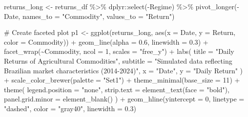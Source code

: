 \documentclass[
  10pt,
  a4paper,
]{article}
\newenvironment{Shaded}{\begin{snugshade}}{\end{snugshade}}
\newcommand{\AttributeTok}[1]{\textcolor[rgb]{0.40,0.45,0.13}{#1}}
\newcommand{\CommentTok}[1]{\textcolor[rgb]{0.37,0.37,0.37}{#1}}
\newcommand{\DecValTok}[1]{\textcolor[rgb]{0.68,0.00,0.00}{#1}}
\newcommand{\FloatTok}[1]{\textcolor[rgb]{0.68,0.00,0.00}{#1}}
\newcommand{\FunctionTok}[1]{\textcolor[rgb]{0.28,0.35,0.67}{#1}}
\newcommand{\NormalTok}[1]{\textcolor[rgb]{0.00,0.23,0.31}{#1}}
\newcommand{\OtherTok}[1]{\textcolor[rgb]{0.00,0.23,0.31}{#1}}
\newcommand{\SpecialCharTok}[1]{\textcolor[rgb]{0.37,0.37,0.37}{#1}}
\newcommand{\StringTok}[1]{\textcolor[rgb]{0.13,0.47,0.30}{#1}}
\begin{document}
\begin{Shaded}
\begin{Highlighting}[]
\NormalTok{returns\_long }\OtherTok{\textless{}{-}}\NormalTok{ returns\_df }\SpecialCharTok{\%\textgreater{}\%}
\NormalTok{  dplyr}\SpecialCharTok{::}\FunctionTok{select}\NormalTok{(}\SpecialCharTok{{-}}\NormalTok{Regime) }\SpecialCharTok{\%\textgreater{}\%}
  \FunctionTok{pivot\_longer}\NormalTok{(}\SpecialCharTok{{-}}\NormalTok{Date, }\AttributeTok{names\_to =} \StringTok{"Commodity"}\NormalTok{, }\AttributeTok{values\_to =} \StringTok{"Return"}\NormalTok{)}

\CommentTok{\# Create faceted plot}
\NormalTok{p1 }\OtherTok{\textless{}{-}} \FunctionTok{ggplot}\NormalTok{(returns\_long, }\FunctionTok{aes}\NormalTok{(}\AttributeTok{x =}\NormalTok{ Date, }\AttributeTok{y =}\NormalTok{ Return, }\AttributeTok{color =}\NormalTok{ Commodity)) }\SpecialCharTok{+}
  \FunctionTok{geom\_line}\NormalTok{(}\AttributeTok{alpha =} \FloatTok{0.6}\NormalTok{, }\AttributeTok{linewidth =} \FloatTok{0.3}\NormalTok{) }\SpecialCharTok{+}
  \FunctionTok{facet\_wrap}\NormalTok{(}\SpecialCharTok{\textasciitilde{}}\NormalTok{Commodity, }\AttributeTok{ncol =} \DecValTok{1}\NormalTok{, }\AttributeTok{scales =} \StringTok{"free\_y"}\NormalTok{) }\SpecialCharTok{+}
  \FunctionTok{labs}\NormalTok{(}
    \AttributeTok{title =} \StringTok{"Daily Returns of Agricultural Commodities"}\NormalTok{,}
    \AttributeTok{subtitle =} \StringTok{"Simulated data reflecting Brazilian market characteristics (2014{-}2024)"}\NormalTok{,}
    \AttributeTok{x =} \StringTok{"Date"}\NormalTok{,}
    \AttributeTok{y =} \StringTok{"Daily Return"}
\NormalTok{  ) }\SpecialCharTok{+}
  \FunctionTok{scale\_color\_brewer}\NormalTok{(}\AttributeTok{palette =} \StringTok{"Set1"}\NormalTok{) }\SpecialCharTok{+}
  \FunctionTok{theme\_minimal}\NormalTok{(}\AttributeTok{base\_size =} \DecValTok{11}\NormalTok{) }\SpecialCharTok{+}
  \FunctionTok{theme}\NormalTok{(}
    \AttributeTok{legend.position =} \StringTok{"none"}\NormalTok{,}
    \AttributeTok{strip.text =} \FunctionTok{element\_text}\NormalTok{(}\AttributeTok{face =} \StringTok{"bold"}\NormalTok{),}
    \AttributeTok{panel.grid.minor =} \FunctionTok{element\_blank}\NormalTok{()}
\NormalTok{  ) }\SpecialCharTok{+}
  \FunctionTok{geom\_hline}\NormalTok{(}\AttributeTok{yintercept =} \DecValTok{0}\NormalTok{, }\AttributeTok{linetype =} \StringTok{"dashed"}\NormalTok{, }\AttributeTok{color =} \StringTok{"gray40"}\NormalTok{, }\AttributeTok{linewidth =} \FloatTok{0.3}\NormalTok{)}


\end{Highlighting}
\end{Shaded}
\end{document}
